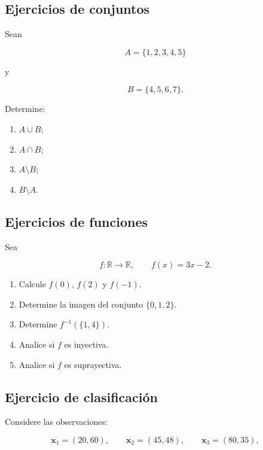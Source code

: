 \documentclass[
  spanish,
  10.5pt,
  letterpaper,
  DIV=11,
  numbers=noendperiod,
  oneside,
  open=any]{scrreprt}
\providecommand{\tightlist}{%
  \setlength{\itemsep}{0pt}\setlength{\parskip}{0pt}}
\theoremstyle{definition}
\theoremstyle{definition}
\theoremstyle{plain}
\theoremstyle{remark}
\begin{document}
\subsection*{Ejercicios de conjuntos}\label{ejercicios-de-conjuntos}

Sean

\[
A=\{1,2,3,4,5\}
\]

y

\[
B=\{4,5,6,7\}.
\]

Determine:

\begin{enumerate}
\def\labelenumi{\arabic{enumi}.}
\tightlist
\item
  \(A\cup B\);
\item
  \(A\cap B\);
\item
  \(A\setminus B\);
\item
  \(B\setminus A\).
\end{enumerate}

\subsection*{Ejercicios de funciones}\label{ejercicios-de-funciones}

Sea

\[
f:\mathbb{R}\to\mathbb{R},
\qquad
f(x)=3x-2.
\]

\begin{enumerate}
\def\labelenumi{\arabic{enumi}.}
\tightlist
\item
  Calcule \(f(0)\), \(f(2)\) y \(f(-1)\).
\item
  Determine la imagen del conjunto \(\{0,1,2\}\).
\item
  Determine \(f^{-1}(\{1,4\})\).
\item
  Analice si \(f\) es inyectiva.
\item
  Analice si \(f\) es suprayectiva.
\end{enumerate}

\subsection*{Ejercicio de
clasificación}\label{ejercicio-de-clasificaciuxf3n}

Considere las observaciones:

\[
\mathbf{x}_1=(20,60),
\qquad
\mathbf{x}_2=(45,48),
\qquad
\mathbf{x}_3=(80,35),
\]
\end{document}
